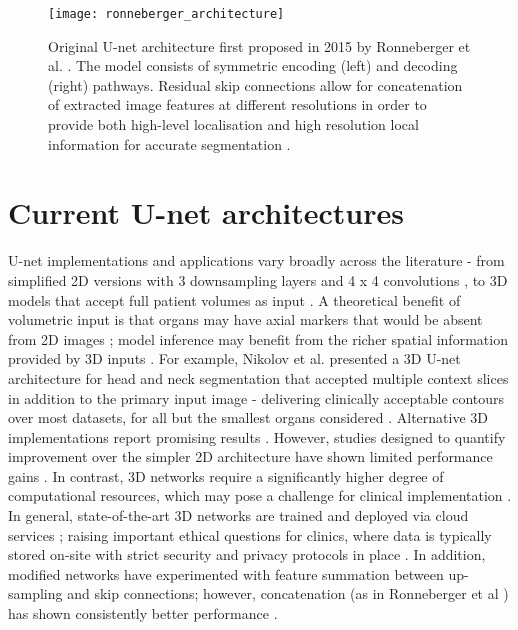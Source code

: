 \begin{figure}
	\begin{center}
		\texttt{[image: ronneberger\_architecture]}
		\caption{Original U-net architecture first proposed in 2015 by Ronneberger et al. \cite{Ronneberger_2015}. The model consists of symmetric encoding (left) and decoding (right) pathways. Residual skip connections allow for concatenation of extracted image features at different resolutions in order to provide both high-level localisation and high resolution local information for accurate segmentation \cite{Nemoto_2020}.}
		\label{fig:unet}
	\end{center}
\end{figure}



\section{Current U-net architectures}
U-net implementations and applications vary broadly across the literature - from simplified 2D versions with 3 downsampling layers and 4 x 4 convolutions \cite{Nemoto_2020}, to 3D models that accept full patient volumes as input \cite{Zhu_2018}. A theoretical benefit of volumetric input is that organs may have axial markers that would be absent from 2D images \cite{Hesamian2019}; model inference may benefit from the richer spatial information provided by 3D inputs \cite{Nemoto_2020}. For example, Nikolov et al. presented a 3D U-net architecture for head and neck segmentation that accepted multiple context slices in addition to the primary input image \cite{Nikolov_2018} - delivering clinically acceptable contours over most datasets, for all but the smallest organs considered \cite{Nikolov_2018}. Alternative 3D implementations report promising results \cite{ Nikolov_2018, Zhu_2018, _i_ek_2016}. However, studies designed to quantify improvement over the simpler 2D architecture have shown limited performance gains \cite{Nemoto_2020}. In contrast, 3D networks require a significantly higher degree of computational resources, which may pose a challenge for clinical implementation \cite{Nemoto_2020}. In general, state-of-the-art 3D networks are trained and deployed via cloud services \cite{Nemoto_2020}; raising important ethical questions for clinics, where data is typically stored on-site with strict security and privacy protocols in place \cite{Nemoto_2020, Lundervold2019}. In addition, modified networks have experimented with feature summation between up-sampling and skip connections; however, concatenation (as in Ronneberger et al \cite{Ronneberger_2015}) has shown consistently better performance \cite{Zhu_2018}.

